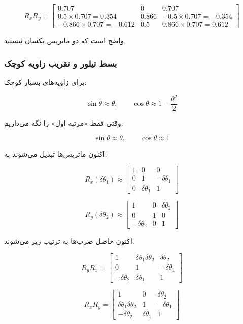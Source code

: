 \documentclass{article}
\begin{document}
\[
R_xR_y =
\begin{bmatrix}
	0.707 & 0 & 0.707\\
	0.5\times0.707 = 0.354 & 0.866 & -0.5\times0.707 = -0.354\\
	-0.866\times0.707 = -0.612 & 0.5 & 0.866\times0.707 = 0.612
\end{bmatrix}
\]

واضح است که دو ماتریس یکسان نیستند.

\subsubsection{بسط تیلور و تقریب زاویه کوچک}

برای زاویه‌های بسیار کوچک:

\[
\sin\theta \approx \theta,\qquad \cos\theta \approx 1- \frac{\theta^2}{2}
\]

وقتی فقط «مرتبه اول» را نگه می‌داریم:

\[
\sin\theta \approx \theta,\qquad \cos\theta \approx 1
\]

اکنون ماتریس‌ها تبدیل می‌شوند به:

\[
R_x(\delta\theta_1)\approx
\begin{bmatrix}
	1 & 0 & 0\\
	0 & 1 & -\delta\theta_1\\
	0 & \delta\theta_1 & 1
\end{bmatrix}
\]

\[
R_y(\delta\theta_2)\approx
\begin{bmatrix}
	1 & 0 & \delta\theta_2\\
	0 & 1 & 0\\
	-\delta\theta_2 & 0 & 1
\end{bmatrix}
\]

اکنون حاصل ضرب‌ها به ترتیب زیر می‌شوند:

\[
R_yR_x =
\begin{bmatrix}
	1 & \delta\theta_1\delta\theta_2 & \delta\theta_2\\
	0 & 1 & -\delta\theta_1\\
	-\delta\theta_2 & \delta\theta_1 & 1
\end{bmatrix}
\]

\[
R_xR_y =
\begin{bmatrix}
	1 & 0 & \delta\theta_2\\
	\delta\theta_1\delta\theta_2 & 1 & -\delta\theta_1\\
	-\delta\theta_2 & \delta\theta_1 & 1
\end{bmatrix}
\]
\end{document}

